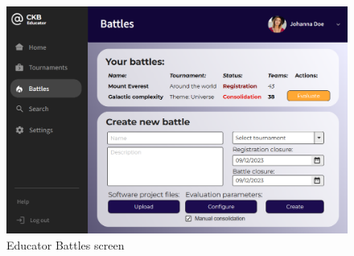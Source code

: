\begin{figure}[H]
    \centering
    \includegraphics[width=0.9\linewidth]{Images/UI_Educator_Battles.png}
    \caption{Educator Battles screen}
    \label{fig:enter-label}
\end{figure}

\clearpage

